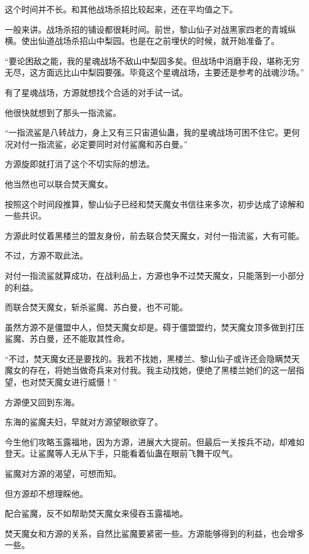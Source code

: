 \begin{this_body}
这个时间并不长。和其他战场杀招比较起来，还在平均值之下。

一般来讲。战场杀招的铺设都很耗时间。前世，黎山仙子对战黑家四老的青城纵横。使出仙道战场杀招山中梨园。也是在之前埋伏的时候，就开始准备了。

“要论困敌之能，我的星魂战场不敌山中梨园多矣。但战场中消磨手段，堪称无穷无尽，这方面远比山中梨园要强。毕竟这个星魂战场，主要还是参考的战魂沙场。”

有了星魂战场，方源就想找个合适的对手试一试。

他很快就想到了那头一指流鲨。

“一指流鲨是八转战力，身上又有三只宙道仙蛊，我的星魂战场可困不住它。更何况对付一指流鲨，必定要同时对付鲨魔和苏白曼。”

方源旋即就打消了这个不切实际的想法。

他当然也可以联合焚天魔女。

按照这个时间段推算，黎山仙子已经和焚天魔女书信往来多次，初步达成了谅解和一些共识。

方源此时仗着黑楼兰的盟友身份，前去联合焚天魔女，对付一指流鲨，大有可能。

不过，方源不取此法。

对付一指流鲨就算成功，在战利品上，方源也争不过焚天魔女，只能落到一小部分的利益。

而联合焚天魔女，斩杀鲨魔、苏白曼，也不可能。

虽然方源不是僵盟中人，但焚天魔女却是。碍于僵盟盟约，焚天魔女顶多做到打压鲨魔、苏白曼，还不能取其性命。

“不过，焚天魔女还是要找的。我若不找她，黑楼兰、黎山仙子或许还会隐瞒焚天魔女的存在，将她当做奇兵来对付我。我主动找她，便绝了黑楼兰她们的这一层指望，也对焚天魔女进行威慑！”

方源便又回到东海。

东海的鲨魔夫妇，早就对方源望眼欲穿了。

今生他们攻略玉露福地，因为方源，进展大大提前。但最后一关按兵不动，却难如登天。让鲨魔等人无从下手，只能看着仙蛊在眼前飞舞干叹气。

鲨魔对方源的渴望，可想而知。

但方源却不想理睬他。

配合鲨魔，反不如帮助焚天魔女来侵吞玉露福地。

焚天魔女和方源的关系，自然比鲨魔要紧密一些。方源能够得到的利益，也会增多一些。

\end{this_body}

